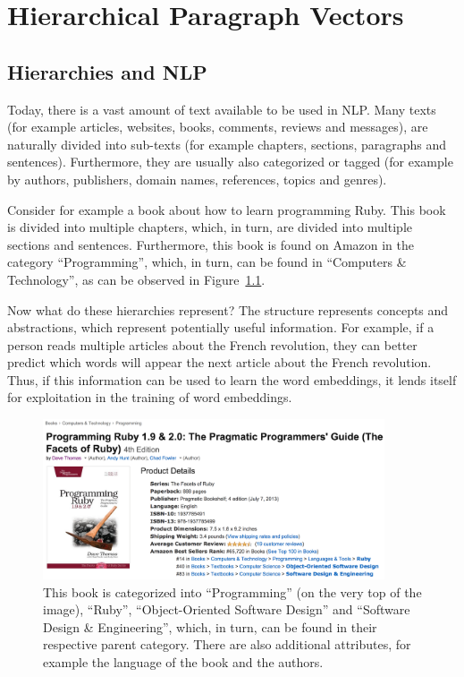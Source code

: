 \chapter{Hierarchical Paragraph Vectors}\label{hierarchical-paragraph-vectors}

\section{Hierarchies and NLP}\label{hierarchies-and-nlp}

Today, there is a vast amount of text available to be used in NLP\@. Many texts (for example articles, websites, books, comments, reviews and messages), are naturally divided into sub-texts (for example chapters, sections, paragraphs and sentences). Furthermore, they are usually also categorized or tagged (for example by authors, publishers, domain names, references, topics and genres).

Consider for example a book about how to learn programming Ruby. This book is divided into multiple chapters, which, in turn, are divided into multiple sections and sentences. Furthermore, this book is found on Amazon in the category ``Programming'', which, in turn, can be found in ``Computers \& Technology'', as can be observed in Figure~\ref{fig:4:book-example}.

Now what do these hierarchies represent? The structure represents concepts and abstractions, which represent potentially useful information. For example, if a person reads multiple articles about the French revolution, they can better predict which words will appear the next article about the French revolution. Thus, if this information can be used to learn the word embeddings, it lends itself for exploitation in the training of word embeddings.

\begin{figure}
	\centering
	\includegraphics[width=0.9\textwidth]{4hpvs/book-example.png}
	\caption[Caption for LOF]{This book is categorized into ``Programming'' (on the very top of the image), ``Ruby'', ``Object-Oriented Software Design'' and ``Software Design \& Engineering'', which, in turn, can be found in their respective parent category. There are also additional attributes, for example the language of the book and the authors.\footnotemark}
	\label{fig:4:book-example}
\end{figure}

